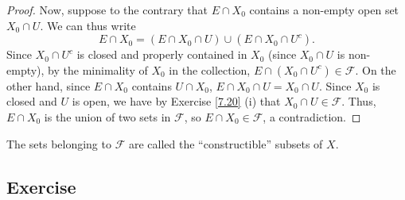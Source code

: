 \begin{proof}
Now, suppose to the contrary that $E \cap X_0$ contains a non-empty open set $X_0 \cap U$. We can thus write 
$$E \cap X_0 = (E \cap X_0 \cap U) \cup (E \cap X_0 \cap U^c).$$
Since $X_0 \cap U^c$ is closed and properly contained in $X_0$ (since $X_0 \cap U$ is non-empty), by the minimality of $X_0$ in the collection, 
$E \cap (X_0 \cap U^c) \in \mathcal{F}$. On the other hand, since $E \cap X_0$
contains $U \cap X_0$, $E \cap X_0 \cap U = X_0 \cap U$. Since $X_0$ is closed and $U$ is open, we have by Exercise \ref{7.20} (i) that $X_0 \cap U \in \mathcal{F}$.
Thus, $E \cap X_0$ is the union of two sets in $\mathcal{F}$, so $E \cap X_0 \in \mathcal{F}$, a contradiction.
\end{proof}

\begin{remark}
The sets belonging to $\mathcal{F}$ are called the ``constructible'' subsets of $X$.
\end{remark}

\subsection{Exercise}\label{7.22}

